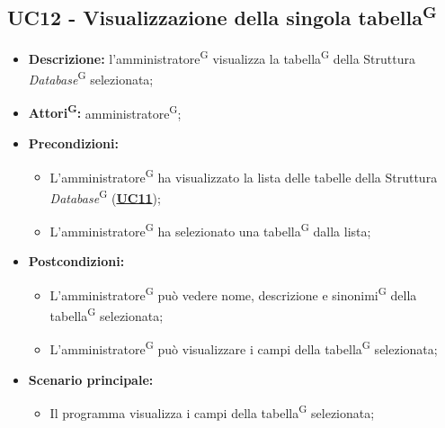 \subsection{UC12 - Visualizzazione della singola tabella\textsuperscript{G}}
\label{sec:UC12}
\begin{itemize}
	\item \textbf{Descrizione:} l’amministratore\textsuperscript{G} visualizza la tabella\textsuperscript{G} della Struttura \textit{Database}\textsuperscript{G} selezionata;
	\item \textbf{Attori\textsuperscript{G}:} amministratore\textsuperscript{G};
	\item \textbf{Precondizioni:} 
	\begin{itemize}
		\item L'amministratore\textsuperscript{G} ha visualizzato la lista delle tabelle della Struttura \textit{Database}\textsuperscript{G} (\hyperref[sec:UC11]{\textbf{UC11}});
		\item L'amministratore\textsuperscript{G} ha selezionato una tabella\textsuperscript{G} dalla lista;
	\end{itemize}
	\item \textbf{Postcondizioni:} 
	\begin{itemize}
		\item L'amministratore\textsuperscript{G} può vedere nome, descrizione e sinonimi\textsuperscript{G} della tabella\textsuperscript{G} selezionata;
		\item L'amministratore\textsuperscript{G} può visualizzare i campi della tabella\textsuperscript{G} selezionata;
	\end{itemize}
	\item \textbf{Scenario principale:} 
	\begin{itemize}
		\item Il programma visualizza i campi della tabella\textsuperscript{G} selezionata;
	\end{itemize}
\end{itemize}

